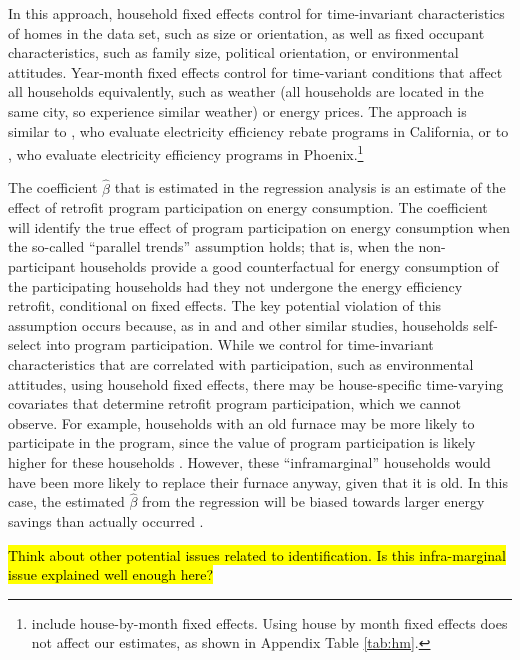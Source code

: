 \documentclass{article}
\newcommand{\hlc}[2][yellow]{ {\sethlcolor{#1} \hl{#2}} }
\begin{document}
In this approach, household fixed effects control for time-invariant characteristics of homes in the data set, such as size or orientation, as well as fixed occupant characteristics, such as family size, political orientation, or environmental attitudes. Year-month fixed effects control for time-variant conditions that affect all households equivalently, such as weather (all households are located in the same city, so experience similar weather) or energy prices. The approach is similar to \cite{chuang2022residential}, who evaluate electricity efficiency rebate programs in California, or to \cite{liang2018energy}, who evaluate electricity efficiency programs in Phoenix.\footnote{\cite{chuang2022residential} include house-by-month fixed effects. Using house by month fixed effects does not affect our estimates, as shown in Appendix Table \ref{tab:hm}.}

The coefficient $\hat{\beta}$ that is estimated in the regression analysis is an estimate of the effect of retrofit program participation on energy consumption. The coefficient will identify the true effect of program participation on energy consumption when the so-called ``parallel trends'' assumption holds; that is, when the non-participant households provide a good counterfactual for energy consumption of the participating households had they not undergone the energy efficiency retrofit, conditional on fixed effects. The key potential violation of this assumption occurs because, as in \cite{liang2018energy} and \cite{chuang2022residential} and other similar studies, households self-select into program participation. While we control for time-invariant characteristics that are correlated with participation, such as environmental attitudes, using household fixed effects, there may be house-specific time-varying covariates that determine retrofit program participation, which we cannot observe. For example, households with an old furnace may be more likely to participate in the program, since the value of program participation is likely higher for these households \citep{rivers2016free}. However, these ``inframarginal'' households would have been more likely to replace their furnace anyway, given that it is old. In this case, the estimated $\hat{\beta}$ from the regression will be biased towards larger energy savings than actually occurred \citep{boomhower2014credible}.

\hlc{Think about other potential issues related to identification. Is this infra-marginal issue explained well enough here?}
\end{document}
